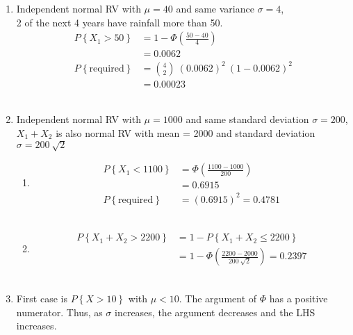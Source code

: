 \begin{enumerate}
\begin{enumerate}
		\end{enumerate}
	
	
	\item Independent normal RV with $ \mu = 40 $ and same variance $ \sigma = 4 $,\\
	
		2 of the next 4 years have rainfall more than 50.\\
		\begin{align}
			P \left\{X_1 > 50\right\} &= 1 - \Phi\left(\frac{50 - 40}{4}\right) \nonumber \\
			&= 0.0062 \nonumber \\
			P\left\{\text{required}\right\} &= \binom{4}{2}\ (0.0062)^2\ (1- 0.0062)^2 \nonumber \\
			&= 0.00023
		\end{align}\\
	
	
	\item Independent normal RV with $ \mu = 1000 $ and same standard deviation $ \sigma = 200 $,\\
	$ X_1 + X_2 $ is also normal RV with mean = 2000 and standard deviation $ \sigma = 200\ \sqrt{2} $
	
		\begin{enumerate}
			\item \begin{align}
				P \left\{X_1 < 1100\right\} &= \Phi\left(\frac{1100 - 1000}{200}\right) \nonumber \\
				&= 0.6915 \\
				P\left\{\text{required}\right\} &= (0.6915)^2 = 0.4781
			\end{align}\\
			
			
			\item \begin{align}
				P \left\{X_1 + X_2 > 2200\right\} &= 1 - P \left\{X_1 + X_2 \leq 2200\right\} \nonumber \\
				& = 1 - \Phi\left(\frac{2200 - 2000}{200\ \sqrt{2}}\right) = 0.2397
			\end{align}\\
		\end{enumerate}
	
	
	\item 
		First case is $ P \left\{X > 10\right\} $ with $ \mu < 10 $. The argument of $ \Phi $ has a positive numerator. Thus, as $ \sigma $ increases, the argument decreases and the LHS increases.\\
		

\end{enumerate}
